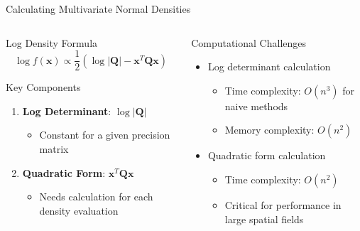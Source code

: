 \documentclass[
  ignorenonframetext,
]{beamer}
\providecommand{\tightlist}{%
  \setlength{\itemsep}{0pt}\setlength{\parskip}{0pt}}\usepackage{longtable,booktabs,array}
\begin{document}
\begin{frame}{Calculating Multivariate Normal Densities}
\label{calculating-multivariate-normal-densities}
\begin{columns}[T]
\begin{column}{0.5\textwidth}
\begin{block}{Log Density Formula}
\label{log-density-formula}
\[
\log f(\mathbf{x}) \propto \frac{1}{2}\left(\log |\mathbf{Q}| - \mathbf{x}^T\mathbf{Q}\mathbf{x}\right)
\]
\end{block}

\begin{block}{Key Components}
\label{key-components}
\begin{enumerate}
\tightlist
\item
  \textbf{Log Determinant}: \(\log |\mathbf{Q}|\)

  \begin{itemize}
  \tightlist
  \item
    Constant for a given precision matrix
  \end{itemize}
\item
  \textbf{Quadratic Form}: \(\mathbf{x}^T\mathbf{Q}\mathbf{x}\)

  \begin{itemize}
  \tightlist
  \item
    Needs calculation for each density evaluation
  \end{itemize}
\end{enumerate}
\end{block}
\end{column}

\begin{column}{0.5\textwidth}
\begin{block}{Computational Challenges}
\label{computational-challenges}
\begin{itemize}
\tightlist
\item
  Log determinant calculation

  \begin{itemize}
  \tightlist
  \item
    Time complexity: \(O(n^3)\) for naive methods
  \item
    Memory complexity: \(O(n^2)\)
  \end{itemize}
\item
  Quadratic form calculation

  \begin{itemize}
  \tightlist
  \item
    Time complexity: \(O(n^2)\)
  \item
    Critical for performance in large spatial fields
  \end{itemize}
\end{itemize}
\end{block}


\end{column}
\end{columns}
\end{frame}
\end{document}
